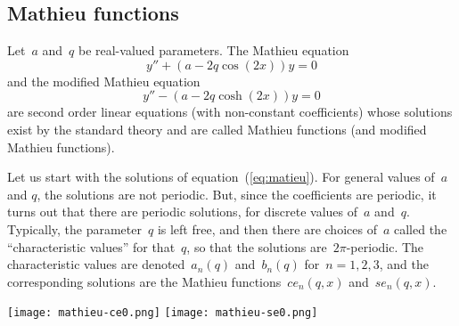 \subsection{Mathieu functions}

Let~$a$ and~$q$ be real-valued parameters.
The Mathieu equation
\begin{equation}\label{eq:mathieu}
	y'' + (a-2q\cos(2x))y = 0
\end{equation}
and the modified Mathieu equation
\begin{equation}\label{eq:mathieumod}
	y'' - (a-2q\cosh(2x))y = 0
\end{equation}
are second order linear equations (with non-constant coefficients)
whose solutions exist by the standard theory and are called Mathieu
functions (and modified Mathieu functions).

Let us start with the solutions of equation~(\ref{eq:matieu}).  For
general values of~$a$ and $q$, the solutions are not periodic.  But,
since the coefficients are periodic, it turns out that there are
periodic solutions, for discrete values of~$a$ and~$q$.  Typically,
the parameter~$q$ is left free, and then there are choices
of~$a$ called the ``characteristic values'' for that~$q$, so that the
solutions are~$2\pi$-periodic.  The characteristic values are
denoted~$a_n(q)$ and~$b_n(q)$ for~$n=1,2,3$, and the corresponding
solutions are the Mathieu functions~$ce_n(q,x)$ and~$se_n(q,x)$.

\clearpage

\texttt{[image: mathieu-ce0.png]}
\texttt{[image: mathieu-se0.png]}

